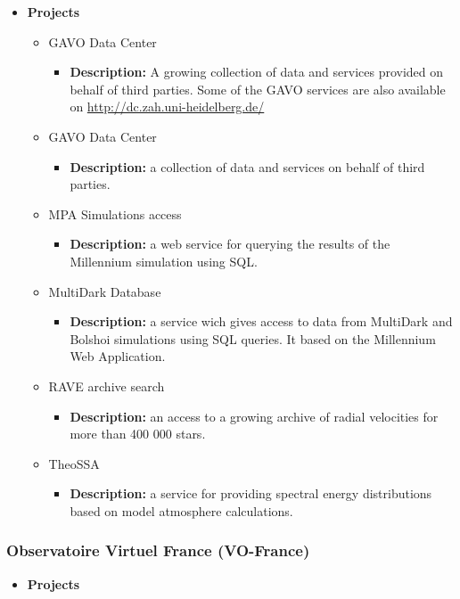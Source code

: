 \begin{itemize}
\item \textbf{Projects}
\begin{itemize}
\item GAVO Data Center
\begin{itemize}
\item \textbf{Description:} A growing collection of data and services provided
on behalf of third parties. Some of the GAVO services are also available on
\url{http://dc.zah.uni-heidelberg.de/}
\end{itemize}
\item GAVO Data Center
\begin{itemize}
\item \textbf{Description:} a collection of data and services on behalf of third
parties.
\end{itemize}
\item MPA Simulations access
\begin{itemize}
\item \textbf{Description:} a web service for querying the results of the
Millennium simulation using SQL.
\end{itemize}
\item MultiDark Database
\begin{itemize}
\item \textbf{Description:} a service wich gives access to data from MultiDark
and Bolshoi simulations using SQL queries.  It based on the Millennium Web
Application.
\end{itemize}
\item RAVE archive search
\begin{itemize}
\item \textbf{Description:} an access to a growing archive of radial velocities
for more than 400 000 stars.
\end{itemize}
\item TheoSSA
\begin{itemize}
\item \textbf{Description:} a service for providing spectral energy
distributions based on model atmosphere calculations.
\end{itemize}
\end{itemize}
\end{itemize}

\subsubsection{Observatoire Virtuel France (VO-France)}
\begin{itemize}
\item \textbf{Projects}
\end{itemize}

